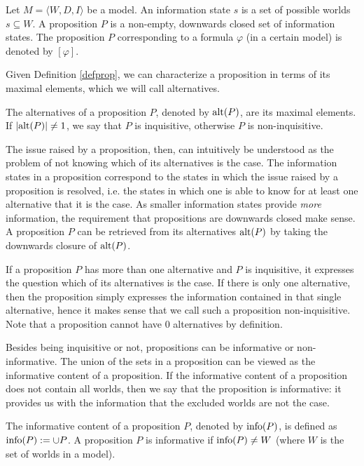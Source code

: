 \begin{defi}\label{defprop}
 Let $M=\langle W,D,I\rangle$ be a model. An information state $s$ is a set of possible worlds $s\subseteq W$. A proposition $P$ is a non-empty, downwards closed set of information states. The proposition $P$ corresponding to a formula $\varphi$ (in a certain model) is denoted by $[\varphi]$.
\end{defi}

Given Definition \ref{defprop}, we can characterize a proposition in terms of its maximal elements, which we will call alternatives. 

\begin{defi}
 The alternatives of a proposition $P$, denoted by $\textrm{alt}(P)$, are its maximal elements. If $|\textrm{alt}(P)|\neq 1$, we say that $P$ is inquisitive, otherwise $P$ is non-inquisitive.
\end{defi}

The issue raised by a proposition, then, can intuitively be understood as the problem of not knowing which of its alternatives is the case. The information states in a proposition correspond to the states in which the issue raised by a proposition is resolved, i.e. the states in which one is able to know for at least one alternative that it is the case. As smaller information states provide \emph{more} information, the requirement that propositions are downwards closed make sense. A proposition $P$ can be retrieved from its alternatives $\textrm{alt}(P)$ by taking the downwards closure of $\textrm{alt}(P)$.

If a proposition $P$ has more than one alternative and $P$ is inquisitive, it expresses the question which of its alternatives is the case. If there is only one alternative, then the proposition simply expresses the information contained in that single alternative, hence it makes sense that we call such a proposition non-inquisitive. Note that a proposition cannot have $0$ alternatives by definition.

Besides being inquisitive or not, propositions can be informative or non-informative. The union of the sets in a proposition can be viewed as the informative content of a proposition. If the informative content of a proposition does not contain all worlds, then we say that the proposition is informative: it provides us with the information that the excluded worlds are not the case. 

\begin{defi}
 The informative content of a proposition $P$, denoted by $\textrm{info}(P)$, is defined as $\textrm{info}(P):=\cup P$. A proposition $P$ is informative if $\textrm{info}(P)\neq W$ (where $W$ is the set of worlds in a model).
\end{defi}

